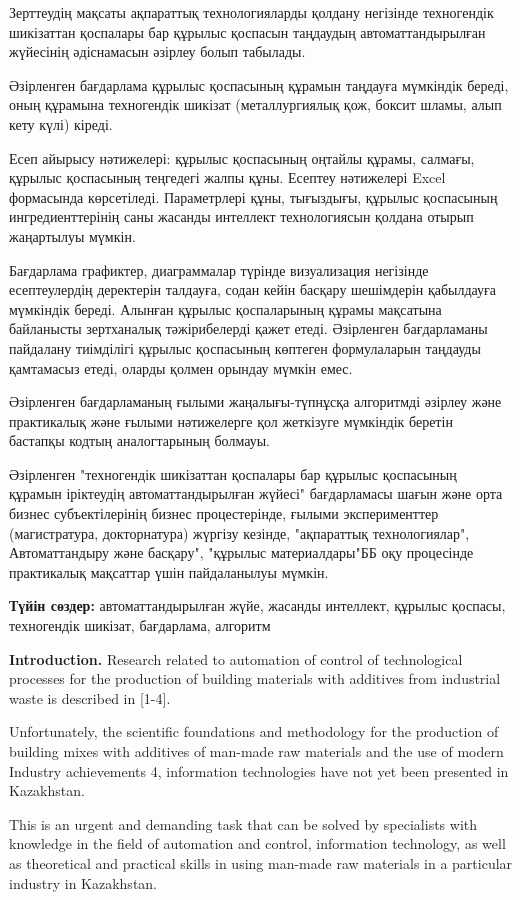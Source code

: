 \documentclass[
]{article}
\begin{document}
Зерттеудің мақсаты ақпараттық технологияларды қолдану негізінде
техногендік шикізаттан қоспалары бар құрылыс қоспасын таңдаудың
автоматтандырылған жүйесінің әдіснамасын әзірлеу болып табылады.

Әзірленген бағдарлама құрылыс қоспасының құрамын таңдауға мүмкіндік
береді, оның құрамына техногендік шикізат (металлургиялық қож, боксит
шламы, алып кету күлі) кіреді.

Есеп айырысу нәтижелері: құрылыс қоспасының оңтайлы құрамы, салмағы,
құрылыс қоспасының теңгедегі жалпы құны. Есептеу нәтижелері Excel
формасында көрсетіледі. Параметрлері құны, тығыздығы, құрылыс қоспасының
ингредиенттерінің саны жасанды интеллект технологиясын қолдана отырып
жаңартылуы мүмкін.

Бағдарлама графиктер, диаграммалар түрінде визуализация негізінде
есептеулердің деректерін талдауға, содан кейін басқару шешімдерін
қабылдауға мүмкіндік береді. Алынған құрылыс қоспаларының құрамы
мақсатына байланысты зертханалық тәжірибелерді қажет етеді. Әзірленген
бағдарламаны пайдалану тиімділігі құрылыс қоспасының көптеген
формулаларын таңдауды қамтамасыз етеді, оларды қолмен орындау мүмкін
емес.

Әзірленген бағдарламаның ғылыми жаңалығы-түпнұсқа алгоритмді әзірлеу
және практикалық және ғылыми нәтижелерге қол жеткізуге мүмкіндік беретін
бастапқы кодтың аналогтарының болмауы.

Әзірленген "техногендік шикізаттан қоспалары бар құрылыс қоспасының
құрамын іріктеудің автоматтандырылған жүйесі" бағдарламасы шағын және
орта бизнес субъектілерінің бизнес процестерінде, ғылыми эксперименттер
(магистратура, докторнатура) жүргізу кезінде, "ақпараттық
технологиялар", Автоматтандыру және басқару", "құрылыс материалдары"ББ
оқу процесінде практикалық мақсаттар үшін пайдаланылуы мүмкін.

\textbf{Түйін сөздер:} автоматтандырылған жүйе, жасанды интеллект,
құрылыс қоспасы, техногендік шикізат, бағдарлама, алгоритм

\textbf{Introduction.} Research related to automation of control of
technological processes for the production of building materials with
additives from industrial waste is described in {[}1-4{]}.

Unfortunately, the scientific foundations and methodology for the
production of building mixes with additives of man-made raw materials
and the use of modern Industry achievements 4, information technologies
have not yet been presented in Kazakhstan.

This is an urgent and demanding task that can be solved by specialists
with knowledge in the field of automation and control, information
technology, as well as theoretical and practical skills in using
man-made raw materials in a particular industry in Kazakhstan.
\end{document}
